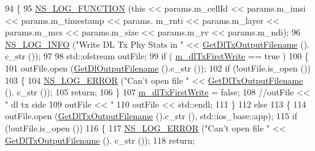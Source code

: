 \begin{DoxyCode}
94 \{
95   \hyperlink{log-macros-disabled_8h_a90b90d5bad1f39cb1b64923ea94c0761}{NS\_LOG\_FUNCTION} (\textcolor{keyword}{this} << params.m\_cellId << params.m\_imsi << params.m\_timestamp << params.
      m\_rnti << params.m\_layer << params.m\_mcs << params.m\_size << params.m\_rv << params.m\_ndi);
96   \hyperlink{group__logging_gafbd73ee2cf9f26b319f49086d8e860fb}{NS\_LOG\_INFO} (\textcolor{stringliteral}{"Write DL Tx Phy Stats in "} << \hyperlink{classns3_1_1PhyTxStatsCalculator_ae0526cc38231c19c53cb3ca6141aa99d}{GetDlTxOutputFilename} ().
      c\_str ());
97 
98   std::ofstream outFile;
99   \textcolor{keywordflow}{if} ( \hyperlink{classns3_1_1PhyTxStatsCalculator_a40a7d5c881ec2afa20a757bb9531fdea}{m\_dlTxFirstWrite} == \textcolor{keyword}{true} )
100     \{
101       outFile.open (\hyperlink{classns3_1_1LteStatsCalculator_a022c578ee2e9eca77969f2f63e71bcc9}{GetDlOutputFilename} ().c\_str ());
102       \textcolor{keywordflow}{if} (!outFile.is\_open ())
103         \{
104           \hyperlink{group__logging_ga0261a8db1d4ac5f79417d117634fd455}{NS\_LOG\_ERROR} (\textcolor{stringliteral}{"Can't open file "} << \hyperlink{classns3_1_1PhyTxStatsCalculator_ae0526cc38231c19c53cb3ca6141aa99d}{GetDlTxOutputFilename} ().
      c\_str ());
105           \textcolor{keywordflow}{return};
106         \}
107       \hyperlink{classns3_1_1PhyTxStatsCalculator_a40a7d5c881ec2afa20a757bb9531fdea}{m\_dlTxFirstWrite} = \textcolor{keyword}{false};
108       \textcolor{comment}{//outFile << "%
       dl tx side}
109       outFile << \textcolor{stringliteral}{"%
110       outFile << std::endl;
111     \}
112   \textcolor{keywordflow}{else}
113     \{
114       outFile.open (\hyperlink{classns3_1_1PhyTxStatsCalculator_ae0526cc38231c19c53cb3ca6141aa99d}{GetDlTxOutputFilename} ().c\_str (),  std::ios\_base::app);
115       \textcolor{keywordflow}{if} (!outFile.is\_open ())
116         \{
117           \hyperlink{group__logging_ga0261a8db1d4ac5f79417d117634fd455}{NS\_LOG\_ERROR} (\textcolor{stringliteral}{"Can't open file "} << \hyperlink{classns3_1_1PhyTxStatsCalculator_ae0526cc38231c19c53cb3ca6141aa99d}{GetDlTxOutputFilename} ().
      c\_str ());
118           \textcolor{keywordflow}{return};
}
\end{DoxyCode}
